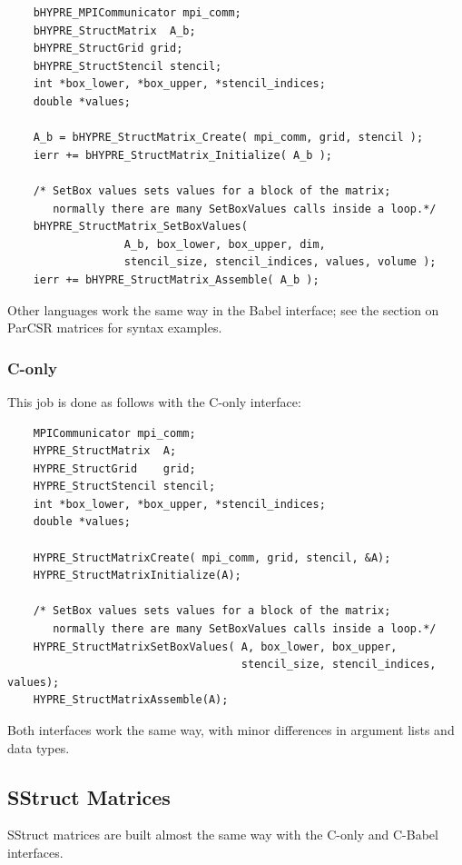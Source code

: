 \begin{verbatim}
    bHYPRE_MPICommunicator mpi_comm;
    bHYPRE_StructMatrix  A_b;
    bHYPRE_StructGrid grid;
    bHYPRE_StructStencil stencil;
    int *box_lower, *box_upper, *stencil_indices;
    double *values;

    A_b = bHYPRE_StructMatrix_Create( mpi_comm, grid, stencil );
    ierr += bHYPRE_StructMatrix_Initialize( A_b );

    /* SetBox values sets values for a block of the matrix;
       normally there are many SetBoxValues calls inside a loop.*/
    bHYPRE_StructMatrix_SetBoxValues(
                  A_b, box_lower, box_upper, dim,
                  stencil_size, stencil_indices, values, volume );
    ierr += bHYPRE_StructMatrix_Assemble( A_b );
\end{verbatim}


Other languages work the same way in the Babel interface; see the
section on ParCSR matrices for syntax examples.

\subsubsection{C-only}

This job is done as follows with the C-only interface:

\begin{verbatim}
    MPICommunicator mpi_comm;
    HYPRE_StructMatrix  A;
    HYPRE_StructGrid    grid;
    HYPRE_StructStencil stencil;
    int *box_lower, *box_upper, *stencil_indices;
    double *values;

    HYPRE_StructMatrixCreate( mpi_comm, grid, stencil, &A);
    HYPRE_StructMatrixInitialize(A);

    /* SetBox values sets values for a block of the matrix;
       normally there are many SetBoxValues calls inside a loop.*/
    HYPRE_StructMatrixSetBoxValues( A, box_lower, box_upper,
                                    stencil_size, stencil_indices, values);
    HYPRE_StructMatrixAssemble(A);
\end{verbatim}


Both interfaces work the same way, with minor differences in argument
lists and data types.

\subsection{SStruct Matrices}

SStruct matrices are built almost the same way with
the C-only and C-Babel interfaces.

